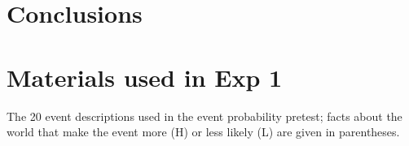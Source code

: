 \documentclass[11pt,fleqn]{article}
\newcommand{\6}{\mbox{$[\hspace*{-.6mm}[$}}
\newcommand{\9}{\mbox{$]\hspace*{-.6mm}]$}}
\begin{document}
\section{Conclusions}\label{s6}


\appendix

\setcounter{table}{0}
\renewcommand{\thetable}{A\arabic{table}}

\setcounter{figure}{0}
\renewcommand{\thefigure}{A\arabic{figure}}

\section{Materials used in Exp 1}\label{a-exp1}

The 20 event descriptions used in the event probability pretest; facts about the world that make the event more (H) or less likely (L) are given in parentheses. 
\end{document}
